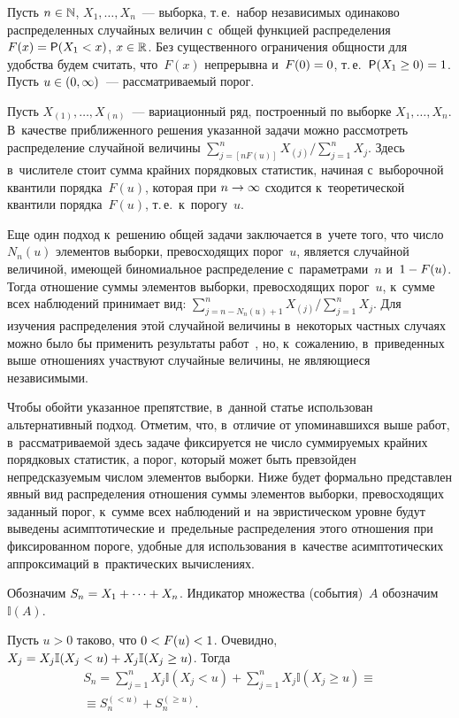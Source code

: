 \begin{multicols}{2}
Пусть $n\hm\in\mathbb{N}$, $X_1,\ldots,X_n$~--- выборка, т.\,е.\ набор
независимых одинаково распределенных случайных величин с~общей
функцией распределения $F(x)\hm={\sf P}(X_1\hm<x)$, $x\hm\in\mathbb{R}$. Без
существенного ограничения общности для удобства будем считать, что~$F(x)$ 
непрерывна и~$F(0)\hm=0$, т.\,е.\ ${\sf P}(X_1\hm\ge0)\hm=1$. 
Пусть $u\hm\in(0,\infty)$~--- рассматриваемый порог.

Пусть $X_{(1)},\ldots,X_{(n)}$~--- вариационный ряд, 
построенный по выборке $X_1,\ldots,X_n$. В~качестве 
приближенного решения указанной задачи можно рассмотреть 
распределение случайной величины
$
{\sum\nolimits_{j=[nF(u)]}^nX_{(j)}}/{\sum\nolimits_{j=1}^nX_j}$.
Здесь в~числителе стоит сумма крайних порядковых статистик, 
начиная с~выборочной квантили порядка~$F(u)$, которая при $n\hm\to\infty$ 
сходится к~теоретической квантили порядка~$F(u)$, т.\,е.\ к~порогу~$u$.

Еще один подход к~решению общей задачи заключается в~учете того, 
что число $N_n(u)$ элементов выборки, превосходящих порог~$u$, 
является случайной величиной, имеющей биномиальное 
распределение с~параметрами~$n$ и~$1\hm-F(u)$. Тогда 
отношение суммы элементов выборки, превосходящих порог~$u$, к~сумме 
всех наблюдений принимает вид:
$
{\sum\nolimits_{j=n-N_n(u)+1}^nX_{(j)}}/{\sum\nolimits_{j=1}^nX_j}
$.
Для изучения распределения этой случайной величины в~некоторых частных 
случаях можно было бы применить результаты 
работ~\cite{3-kor, 5-kor, 7-kor, 9-kor, 12-kor}, 
но, к~сожалению, в~приведенных 
выше отношениях участвуют случайные величины, не являющиеся независимыми.

Чтобы обойти указанное препятствие, в~данной статье использован 
альтернативный подход. Отметим, что, в~отличие от упоминавшихся 
выше работ, в~рассматриваемой здесь задаче фиксируется не число 
суммируемых крайних порядковых статистик, а порог, который может быть 
пре\-взойден непредсказуемым числом элементов выборки. Ниже будет 
формально представлен явный вид распределения отношения суммы 
элементов выборки, превосходящих заданный порог, к~сумме всех 
наблюдений и~на эвристическом уровне будут выведены 
асимптотические и~предельные распределения этого отношения 
при фиксированном пороге, удобные для использования в~качестве 
асимптотических аппроксимаций в~практических вычислениях.

Обозначим $S_n\hm=X_1+\cdots+X_n$. Индикатор множества (события)~$A$
обозначим~$\mathbb{I}(A)$.

Пусть $u>0$ таково, что $0\hm<F(u)\hm<1$. Очевидно, 
$X_j\hm=X_j\mathbb{I}(X_j\hm<u)\hm+X_j\mathbb{I}(X_j\hm\ge u)$. Тогда
\begin{multline*}
S_n=\sum\limits_{j=1}^n X_j\mathbb{I}\left(X_j<u\right)+
\sum\limits_{j=1}^n X_j\mathbb{I}\left(X_j\ge u\right)\equiv{}\\
{}\equiv
S_n^{(<u)}+S_n^{(\ge u)}.
\end{multline*}


\end{multicols}
